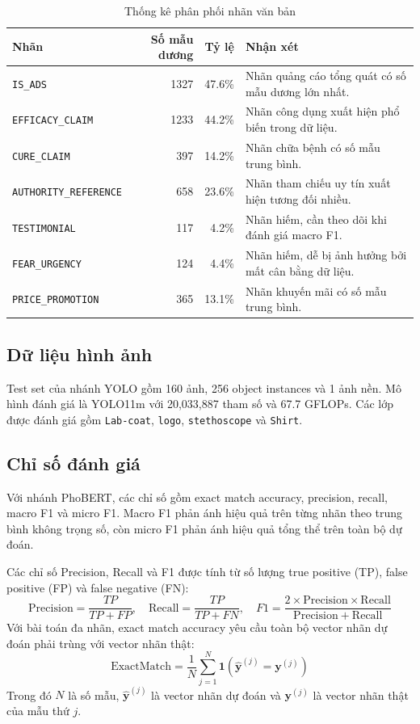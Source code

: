 \begin{table}[H]
\centering
\caption{Thống kê phân phối nhãn văn bản}
\label{tab:text_label_distribution}
\begin{tabularx}{\textwidth}{|L{0.35\textwidth}|r|r|Y|}
\hline
\textbf{Nhãn} & \textbf{Số mẫu dương} & \textbf{Tỷ lệ} & \textbf{Nhận xét} \\
\hline
\texttt{IS\_ADS} & 1327 & 47.6\% & Nhãn quảng cáo tổng quát có số mẫu dương lớn nhất. \\ \hline
\texttt{EFFICACY\_CLAIM} & 1233 & 44.2\% & Nhãn công dụng xuất hiện phổ biến trong dữ liệu. \\ \hline
\texttt{CURE\_CLAIM} & 397 & 14.2\% & Nhãn chữa bệnh có số mẫu trung bình. \\ \hline
\texttt{AUTHORITY\_REFERENCE} & 658 & 23.6\% & Nhãn tham chiếu uy tín xuất hiện tương đối nhiều. \\ \hline
\texttt{TESTIMONIAL} & 117 & 4.2\% & Nhãn hiếm, cần theo dõi khi đánh giá macro F1. \\ \hline
\texttt{FEAR\_URGENCY} & 124 & 4.4\% & Nhãn hiếm, dễ bị ảnh hưởng bởi mất cân bằng dữ liệu. \\ \hline
\texttt{PRICE\_PROMOTION} & 365 & 13.1\% & Nhãn khuyến mãi có số mẫu trung bình. \\ \hline
\end{tabularx}
\end{table}

\subsection{Dữ liệu hình ảnh}
Test set của nhánh YOLO gồm 160 ảnh, 256 object instances và 1 ảnh nền. Mô hình đánh giá là YOLO11m với 20,033,887 tham số và 67.7 GFLOPs. Các lớp được đánh giá gồm \texttt{Lab-coat}, \texttt{logo}, \texttt{stethoscope} và \texttt{Shirt}.

\subsection{Chỉ số đánh giá}
Với nhánh PhoBERT, các chỉ số gồm exact match accuracy, precision, recall, macro F1 và micro F1. Macro F1 phản ánh hiệu quả trên từng nhãn theo trung bình không trọng số, còn micro F1 phản ánh hiệu quả tổng thể trên toàn bộ dự đoán.

Các chỉ số Precision, Recall và F1 được tính từ số lượng true positive (TP), false positive (FP) và false negative (FN):
\[
\mathrm{Precision} = \frac{TP}{TP + FP},
\quad
\mathrm{Recall} = \frac{TP}{TP + FN},
\quad
F1 = \frac{2 \times \mathrm{Precision} \times \mathrm{Recall}}
{\mathrm{Precision} + \mathrm{Recall}}
\]
Với bài toán đa nhãn, exact match accuracy yêu cầu toàn bộ vector nhãn dự đoán phải trùng với vector nhãn thật:
\[
\mathrm{ExactMatch}
= \frac{1}{N}\sum_{j=1}^{N}
\mathbf{1}\left(\hat{\mathbf{y}}^{(j)} = \mathbf{y}^{(j)}\right)
\]
Trong đó \(N\) là số mẫu, \(\hat{\mathbf{y}}^{(j)}\) là vector nhãn dự đoán và \(\mathbf{y}^{(j)}\) là vector nhãn thật của mẫu thứ \(j\).

